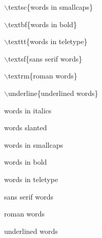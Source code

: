\documentclass[a4paper,portrait,12pt]{article}
\begin{document}
\begin{flushleft}
\ensuremath{\backslash}textsc\{words in smallcaps\}
\end{flushleft}


\begin{flushleft}
\ensuremath{\backslash}textbf\{words in bold\}
\end{flushleft}


\begin{flushleft}
\ensuremath{\backslash}texttt\{words in teletype\}
\end{flushleft}


\begin{flushleft}
\ensuremath{\backslash}textsf\{sans serif words\}
\end{flushleft}


\begin{flushleft}
\ensuremath{\backslash}textrm\{roman words\}
\end{flushleft}


\begin{flushleft}
\ensuremath{\backslash}underline\{underlined words\}
\end{flushleft}





\begin{flushleft}
words in italics
\end{flushleft}


\begin{flushleft}
words slanted
\end{flushleft}


\begin{flushleft}
words in smallcaps
\end{flushleft}


\begin{flushleft}
words in bold
\end{flushleft}


\begin{flushleft}
words in teletype
\end{flushleft}


\begin{flushleft}
sans serif words
\end{flushleft}


\begin{flushleft}
roman words
\end{flushleft}


\begin{flushleft}
underlined words
\end{flushleft}
\end{document}
